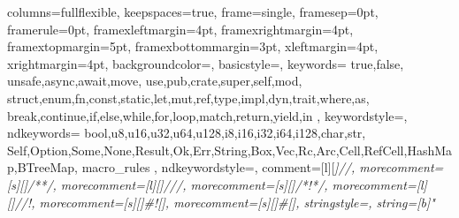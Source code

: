 {
    columns=fullflexible,
    keepspaces=true,
    frame=single,
    framesep=0pt,
    framerule=0pt,
    framexleftmargin=4pt,
    framexrightmargin=4pt,
    framextopmargin=5pt,
    framexbottommargin=3pt,
    xleftmargin=4pt,
    xrightmargin=4pt,
    backgroundcolor=\color{GrayCodeBlock},
    basicstyle=\ttfamily\color{BlackText},
    keywords={
        true,false,
        unsafe,async,await,move,
        use,pub,crate,super,self,mod,
        struct,enum,fn,const,static,let,mut,ref,type,impl,dyn,trait,where,as,
        break,continue,if,else,while,for,loop,match,return,yield,in
    },
    keywordstyle=\color{PurpleKeyword},
    ndkeywords={
        bool,u8,u16,u32,u64,u128,i8,i16,i32,i64,i128,char,str,
        Self,Option,Some,None,Result,Ok,Err,String,Box,Vec,Rc,Arc,Cell,RefCell,HashMap,BTreeMap,
        macro_rules
    },
    ndkeywordstyle=\color{RedTypename},
    comment=[l][\color{GrayComment}\slshape]{//},
    morecomment=[s][\color{GrayComment}\slshape]{/*}{*/},
    morecomment=[l][\color{GoldDocumentation}\slshape]{///},
    morecomment=[s][\color{GoldDocumentation}\slshape]{/*!}{*/},
    morecomment=[l][\color{GoldDocumentation}\slshape]{//!},
    morecomment=[s][\color{RedTypename}]{\#![}{]},
    morecomment=[s][\color{RedTypename}]{\#[}{]},
    stringstyle=\color{GreenString},
    string=[b]"
}



\newcommand{\floatlstinput}[4][]{%
%
}

\newcommand{\lstinput}[4][]{%
%
}

